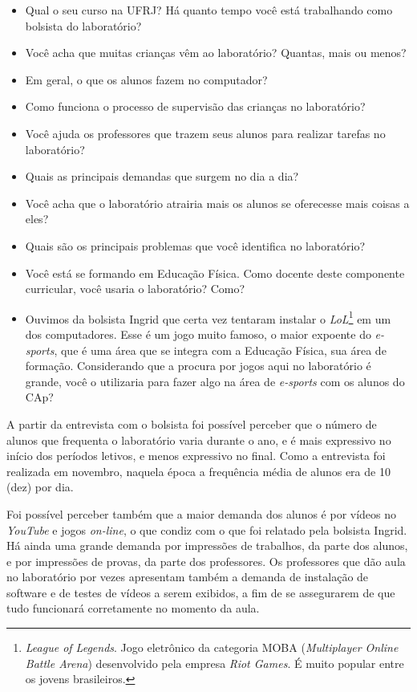 \begin{itemize}
\item{Qual o seu curso na UFRJ? Há quanto tempo você está trabalhando como bolsista do laboratório?}
\item{Você acha que muitas crianças vêm ao laboratório? Quantas, mais ou menos?}
\item{Em geral, o que os alunos fazem no computador?}
\item{Como funciona o processo de supervisão das crianças no laboratório?}
\item{Você ajuda os professores que trazem seus alunos para realizar tarefas no laboratório?}
\item{Quais as principais demandas que surgem no dia a dia?}
\item{Você acha que o laboratório atrairia mais os alunos se oferecesse mais coisas a eles?}
\item{Quais são os principais problemas que você identifica no laboratório?}
\item{Você está se formando em Educação Física. Como docente deste componente curricular, você usaria o laboratório? Como?}
\item{Ouvimos da bolsista Ingrid que certa vez tentaram instalar o \textit{LoL}\footnote{\textit{League of Legends}. Jogo eletrônico da categoria MOBA (\textit{Multiplayer Online Battle Arena}) desenvolvido pela empresa \textit{Riot Games}. É muito popular entre os jovens brasileiros.} em um dos computadores. Esse é um jogo muito famoso, o maior expoente do \textit{e-sports}, que é uma área que se integra com a Educação Física, sua área de formação. Considerando que a procura por jogos aqui no laboratório é grande, você o utilizaria para fazer algo na área de \textit{e-sports} com os alunos do CAp?}
\end{itemize}

A partir da entrevista com o bolsista foi possível perceber que o número de alunos que frequenta o laboratório varia durante o ano, e é mais expressivo no início dos períodos letivos, e menos expressivo no final. Como a entrevista foi realizada em novembro, naquela época a frequência média de alunos era de 10 (dez) por dia.

Foi possível perceber também que a maior demanda dos alunos é por vídeos no \textit{YouTube} e jogos \textit{on-line}, o que condiz com o que foi relatado pela bolsista Ingrid. Há ainda uma grande demanda por impressões de trabalhos, da parte dos alunos, e por impressões de provas, da parte dos professores. Os professores que dão aula no laboratório por vezes apresentam também a demanda de instalação de software e de testes de vídeos a serem exibidos, a fim de se assegurarem de que tudo funcionará corretamente no momento da aula.

